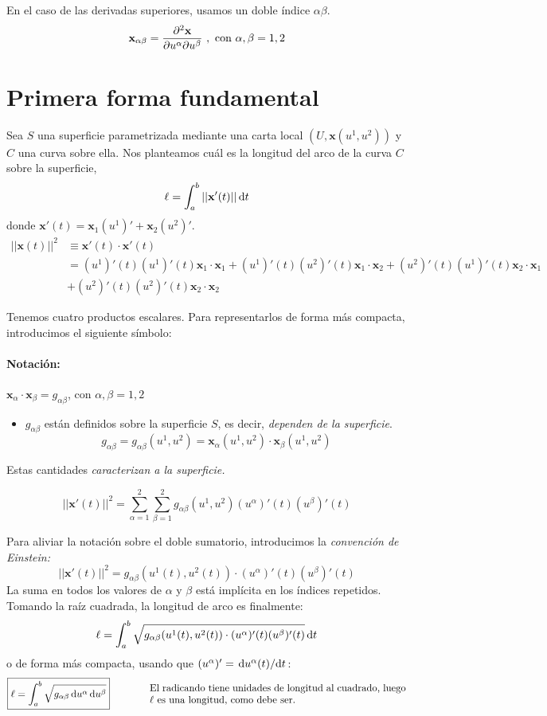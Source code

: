 En el caso de las derivadas superiores, usamos un doble índice $\alpha \beta$.
$$
\mathbf{x}_{\alpha \beta}=\pdv{\mathbf{x}}{u^\alpha}{u^\beta} \ , \ \text{con } \alpha,\beta=1,2 
$$



\section{Primera forma fundamental}
Sea $S$ una superficie parametrizada mediante una carta local $(U,\mathbf{x}(u^1,u^2))$ y $C$ una curva sobre ella. Nos planteamos cuál es la longitud del arco de la curva $C$ sobre la superficie,
$$
\ell =\int_a^b ||\mathbf{x'}(t)|| \odif{t}
$$
donde $\mathbf{x'}(t)=\mathbf{x}_1(u^1)'+\mathbf{x}_2(u^2)'$.
\begin{equation*}
\begin{split}
||\mathbf{x}(t)||^2&\equiv \mathbf{x'}(t)\cdot \mathbf{x'}(t)\\
               &=(u^1)'(t)(u^1)'(t)\mathbf{x}_1\cdot \mathbf{x}_1+(u^1)'(t)(u^2)'(t)\mathbf{x}_1\cdot \mathbf{x}_2+(u^2)'(t)(u^1)'(t)\mathbf{x}_2\cdot \mathbf{x}_1\\
               &+(u^2)'(t)(u^2)'(t)\mathbf{x}_2\cdot \mathbf{x}_2
\end{split}
\end{equation*}

Tenemos cuatro productos escalares. Para representarlos de forma más compacta, introducimos el siguiente símbolo:
\paragraph{Notación:} $\boxed{\mathbf{x}_\alpha \cdot \mathbf{x}_\beta=g_{\alpha\beta}}$, con $\alpha,\beta =1,2$
\begin{itemize}
    \item $g_{\alpha\beta}$ están definidos sobre la superficie $S$, es decir, \emph{dependen de la superficie}.
    $$
    g_{\alpha\beta}=g_{\alpha\beta}(u^1,u^2)=\mathbf{x}_\alpha(u^1,u^2)\cdot \mathbf{x}_\beta (u^1,u^2)
    $$
\end{itemize}

Estas cantidades \emph{caracterizan a la superficie.}

$$
||\mathbf{x}'(t)||^2=\sum_{\alpha=1}^2\sum_{\beta=1}^2 g_{\alpha\beta }(u^1,u^2)(u^\alpha)'(t)(u^\beta)'(t)
$$

Para aliviar la notación sobre el doble sumatorio, introducimos la \emph{convención de Einstein:}
$$
||\mathbf{x}'(t)||^2=g_{\alpha\beta}(u^1(t),u^2(t))\cdot (u^\alpha)'(t)(u^\beta)'(t)
$$
La suma en todos los valores de $\alpha$ y $\beta$ está implícita en los índices repetidos. Tomando la raíz cuadrada, la longitud de arco es finalmente:
$$
\ell =\int_a^b \sqrt{g_{\alpha\beta}(u^1(t),u^2(t))\cdot (u^\alpha)'(t)(u^\beta)'(t)}\odif{t}
$$
o de forma más compacta, usando que $(u^\alpha )'=\dv*{u^\alpha(t)}{t}$:
$$
\boxed{\ell =\int_a^b \sqrt{g_{\alpha\beta}\odif{u^\alpha}\odif{u^\beta}}} \qquad \qquad \text{\parbox{9cm}{El radicando tiene unidades de longitud al cuadrado, luego $\ell$ es una longitud, como debe ser.}}
$$

